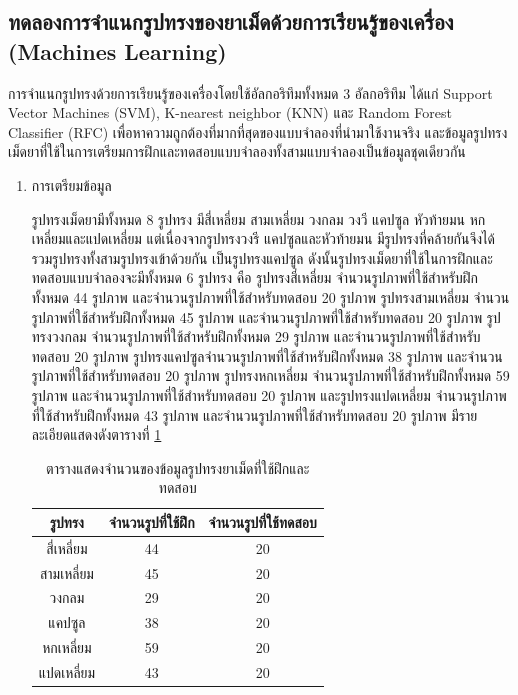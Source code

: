 	\subsection{ทดลองการจำแนกรูปทรงของยาเม็ดด้วยการเรียนรู้ของเครื่อง (Machines Learning)}
		การจำแนกรูปทรงด้วยการเรียนรู้ของเครื่องโดยใช้อัลกอริทึมทั้งหมด 3 อัลกอริทึม ได้แก่ Support Vector Machines (SVM), K-nearest neighbor (KNN) และ Random Forest Classifier (RFC) เพื่อหาความถูกต้องที่มากที่สุดของแบบจำลองที่นำมาใช้งานจริง และข้อมูลรูปทรงเม็ดยาที่ใช้ในการเตรียมการฝึกและทดสอบแบบจำลองทั้งสามแบบจำลองเป็นข้อมูลชุดเดียวกัน 
		\begin{enumerate}
			\item การเตรียมข้อมูล
			

			รูปทรงเม็ดยามีทั้งหมด 8 รูปทรง มีสี่เหลี่ยม สามเหลี่ยม วงกลม วงวี แคปซูล หัวท้ายมน หกเหลี่ยมและแปดเหลี่ยม 
			แต่เนื่องจากรูปทรงวงรี แคปซูลและหัวท้ายมน มีรูปทรงที่คล้ายกันจึงได้รวมรูปทรงทั้งสามรูปทรงเข้าด้วยกัน 
			เป็นรูปทรงแคปซูล ดังนั้นรูปทรงเม็ดยาที่ใช้ในการฝึกและทดสอบแบบจำลองจะมีทั้งหมด 6 รูปทรง 
			คือ 
			รูปทรงสี่เหลี่ยม จำนวนรูปภาพที่ใช้สำหรับฝึกทั้งหมด 44 รูปภาพ และจำนวนรูปภาพที่ใช้สำหรับทดสอบ 20 รูปภาพ
			รูปทรงสามเหลี่ยม จำนวนรูปภาพที่ใช้สำหรับฝึกทั้งหมด 45 รูปภาพ และจำนวนรูปภาพที่ใช้สำหรับทดสอบ 20 รูปภาพ
			รูปทรงวงกลม จำนวนรูปภาพที่ใช้สำหรับฝึกทั้งหมด 29 รูปภาพ และจำนวนรูปภาพที่ใช้สำหรับทดสอบ 20 รูปภาพ
			รูปทรงแคปซูลจำนวนรูปภาพที่ใช้สำหรับฝึกทั้งหมด 38 รูปภาพ และจำนวนรูปภาพที่ใช้สำหรับทดสอบ 20 รูปภาพ
			รูปทรงหกเหลี่ยม จำนวนรูปภาพที่ใช้สำหรับฝึกทั้งหมด 59 รูปภาพ และจำนวนรูปภาพที่ใช้สำหรับทดสอบ 20 รูปภาพ
			และรูปทรงแปดเหลี่ยม จำนวนรูปภาพที่ใช้สำหรับฝึกทั้งหมด 43 รูปภาพ และจำนวนรูปภาพที่ใช้สำหรับทดสอบ 20 รูปภาพ
			มีรายละเอียดแสดงดังตารางที่ \ref{tab:data-set} 

			\begin{table}[H]
				\centering
				\caption{ตารางแสดงจำนวนของข้อมูลรูปทรงยาเม็ดที่ใช้ฝึกและทดสอบ}
				\label{tab:data-set}
				\begin{tabular}{ | c | c | c | }
				\hline
				\textbf{รูปทรง}} &
				\textbf{จำนวนรูปที่ใช้ฝึก} &
				\textbf{จำนวนรูปที่ใช้ทดสอบ} \\ \hline
				สี่เหลี่ยม   & 
				44  &  
				20  \\ \hline
				สามเหลี่ยม & 
				45 &  
				20  \\ \hline
				วงกลม    & 
				29  & 
				20  \\ \hline
				แคปซูล   &  
				38 &  
				20 \\ \hline
				หกเหลี่ยม  & 
				59  & 
				20   \\ \hline
				แปดเหลี่ยม & 
				43  &  
				20  \\ \hline
				\end{tabular}
			\end{table}
			


\end{enumerate}
